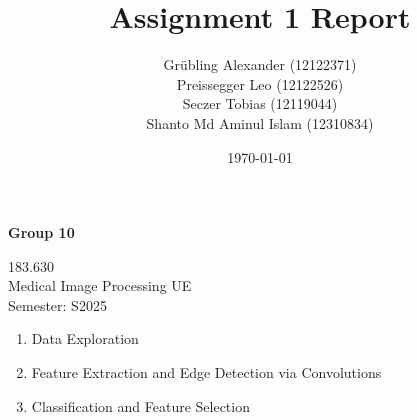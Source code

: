 \documentclass[
    a4paper,
    12pt,
    parskip=half,
]{scrarticle}
\title{Assignment 1 Report}
\author{Grübling Alexander (12122371) \\ Preissegger Leo (12122526) \\  Seczer Tobias (12119044) \\ Shanto Md Aminul Islam (12310834) }
\date{\today}
\begin{document}
\thispagestyle{empty}
\begin{titlepage}
    \makeatletter
    \centering
    {\LARGE \bfseries \sffamily \@title \par}
    \vspace{3\baselineskip}
    {\large \bfseries \sffamily Group 10 \par}
    {\large \@author \par}
    {\large \@date \par}
    \vspace{2\baselineskip}
    \vfill{}
    {\large
    183.630 \\
    Medical Image Processing UE \\
    Semester: S2025 \par}
    \makeatother
\end{titlepage}


\begin{enumerate}
    \item Data Exploration
    \item Feature Extraction and Edge Detection via Convolutions
    \item Classification and Feature Selection
\end{enumerate}
\end{document}
